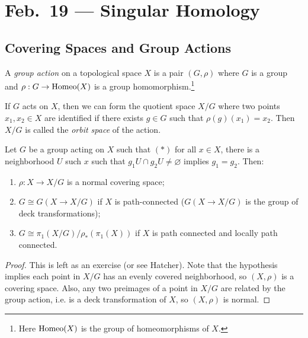 \chapter{Feb.~19 --- Singular Homology}

\section{Covering Spaces and Group Actions}

\begin{definition}
  A \emph{group action} on a topological space $X$ is
  a pair $(G, \rho)$ where $G$ is a group and
  $\rho : G \to \operatorname{Homeo}(X)$ is a group homomorphism.\footnote{Here $\operatorname{Homeo}(X)$ is the group of homeomorphisms of $X$.}
\end{definition}

\begin{remark}
  If $G$ acts on $X$, then we can form the quotient
  space $X / G$ where two points $x_1, x_2 \in X$ are
  identified if there exists $g \in G$ such that
  $\rho(g)(x_1) = x_2$. Then $X / G$ is called the
  \emph{orbit space} of the action.
\end{remark}

\begin{theorem}
  Let $G$ be a group acting on $X$ such that $(*)$
  for all $x \in X$, there is a neighborhood
  $U$ such $x$ such that $g_1 U \cap g_2 U \ne \varnothing$
  implies $g_1 = g_2$. Then:
  \begin{enumerate}
    \item $\rho : X \to X / G$ is a normal covering
      space;
    \item $G \cong G(X \to X / G)$ if $X$ is
      path-connected ($G(X \to X / G)$ is
      the group of deck transformations);
    \item $G \cong \pi_1(X / G) / \rho_*(\pi_1(X))$
      if $X$ is path connected and locally path
      connected.
  \end{enumerate}
\end{theorem}

\begin{proof}
  This is left as an exercise (or see Hatcher). Note
  that the hypothesis implies each point in
  $X / G$ has an evenly covered neighborhood, so
  $(X, \rho)$ is a covering space. Also, any two
  preimages of a point in $X / G$ are related by the
  group action, i.e. is a deck transformation
  of $X$, so $(X, \rho)$ is normal.
\end{proof}

